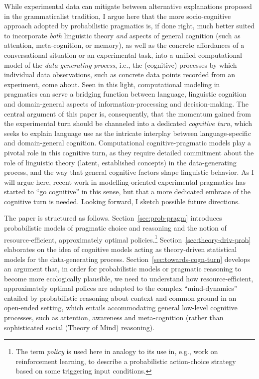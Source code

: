 \documentclass[fleqn,reqno,12pt]{article}
\begin{document}
While experimental data can mitigate between alternative explanations proposed in the grammaticalist tradition, I argue here that the more socio-cognitive approach adopted by probabilistic pragmatics is, if done right, much better suited to incorporate \textit{both} linguistic theory \textit{and} aspects of general cognition (such as attention, meta-cognition, or memory), as well as the concrete affordances of a conversational situation or an experimental task, into a unified computational model of the \emph{data-generating process}, i.e., the (cognitive) processes by which individual data observations, such as concrete data points recorded from an experiment, come about.
Seen in this light, computational modeling in pragmatics can serve a bridging function between language, linguistic cognition and domain-general aspects of information-processing and decision-making.
The central argument of this paper is, consequently, that the momentum gained from the experimental turn should be channeled into a dedicated \emph{cognitive turn}, which seeks to explain language use as the intricate interplay between language-specific and domain-general cognition.
Computational cognitive-pragmatic models play a pivotal role in this cognitive turn, as they require detailed commitment about the role of linguistic theory (latent, established concepts) in the data-generating process, and the way that general cognitive factors shape linguistic behavior.
As I will argue here, recent work in modelling-oriented experimental pragmatics has started to ``go cognitive'' in this sense, but that a more dedicated embrace of the cognitive turn is needed.
Looking forward, I sketch possible future directions.

The paper is structured as follows.
Section~\ref{sec:prob-pragm} introduces probabilistic models of pragmatic choice and reasoning and the notion of resource-efficient, approximately optimal policies.\footnote{
  The term \textit{policy} is used here in analogy to its use in, e.g., work on reinforcement learning, to describe a probabilistic action-choice strategy based on some triggering input conditions.
}
Section~\ref{sec:theory-driv-prob} elaborates on the idea of cognitive models acting as theory-driven statistical models for the data-generating process.
Section~\ref{sec:towards-cogn-turn} develops an argument that, in order for probabilistic models or pragmatic reasoning to become more ecologically plausible, we need to understand how resource-efficient, approximately optimal polices are adapted to the complex ``mind-dynamics'' entailed by probabilistic reasoning about context and common ground in an open-ended setting, which entails accommodating general low-level cognitive processes, such as attention, awareness and meta-cognition (rather than sophisticated social (Theory of Mind) reasoning).
\end{document}
